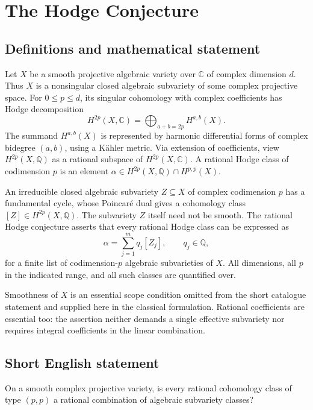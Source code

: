 \documentclass[11pt,a4paper]{article}
\begin{document}
\section*{The Hodge Conjecture}\label{statement}

\subsection{Definitions and mathematical statement}
Let $X$ be a smooth projective algebraic variety over $\mathbb C$ of
complex dimension $d$. Thus $X$ is a nonsingular closed algebraic subvariety
of some complex projective space. For $0\le p\le d$, its singular
cohomology with complex coefficients has Hodge decomposition
\[
 H^{2p}(X,\mathbb C)=\bigoplus_{a+b=2p}H^{a,b}(X).
\]
The summand $H^{a,b}(X)$ is represented by harmonic differential forms
of complex bidegree $(a,b)$, using a Kähler metric.
Via extension of coefficients, view $H^{2p}(X,\mathbb Q)$ as a rational
subspace of $H^{2p}(X,\mathbb C)$. A rational Hodge class of codimension
$p$ is an element
$\alpha\in H^{2p}(X,\mathbb Q)\cap H^{p,p}(X)$.

An irreducible closed algebraic subvariety $Z\subseteq X$ of complex
codimension $p$ has a fundamental cycle, whose Poincaré dual gives a
cohomology class $[Z]\in H^{2p}(X,\mathbb Q)$. The subvariety $Z$ itself
need not be smooth.
The rational Hodge conjecture asserts that every rational Hodge class
can be expressed as
\[
 \alpha=\sum_{j=1}^m q_j[Z_j],\qquad q_j\in\mathbb Q,
\]
for a finite list of codimension-$p$ algebraic subvarieties of $X$.
All dimensions, all $p$ in the indicated range, and all such classes
are quantified over.

Smoothness of $X$ is an essential scope condition omitted from the short
catalogue statement and supplied here in the classical formulation.
Rational coefficients are essential too: the assertion neither demands
a single effective subvariety nor requires integral coefficients in the
linear combination.
\subsection{Short English statement}
On a smooth complex projective variety, is every rational cohomology class of type $(p,p)$ a rational combination of algebraic subvariety classes?
\end{document}
